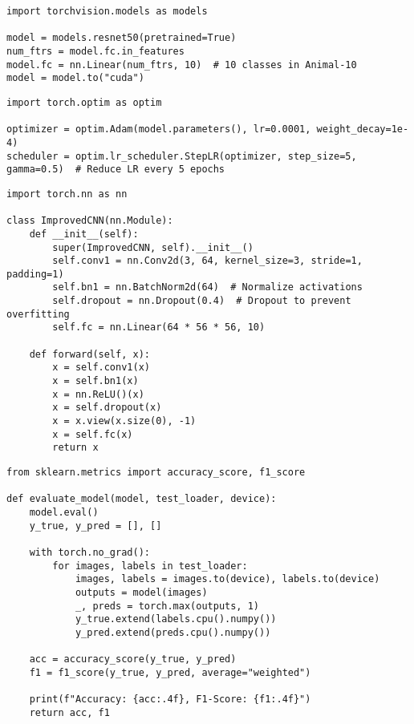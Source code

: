 \begin{verbatim}
import torchvision.models as models

model = models.resnet50(pretrained=True)
num_ftrs = model.fc.in_features
model.fc = nn.Linear(num_ftrs, 10)  # 10 classes in Animal-10
model = model.to("cuda")

\end{verbatim}

\begin{verbatim}
import torch.optim as optim

optimizer = optim.Adam(model.parameters(), lr=0.0001, weight_decay=1e-4)
scheduler = optim.lr_scheduler.StepLR(optimizer, step_size=5, gamma=0.5)  # Reduce LR every 5 epochs

\end{verbatim}

\begin{verbatim}
import torch.nn as nn

class ImprovedCNN(nn.Module):
    def __init__(self):
        super(ImprovedCNN, self).__init__()
        self.conv1 = nn.Conv2d(3, 64, kernel_size=3, stride=1, padding=1)
        self.bn1 = nn.BatchNorm2d(64)  # Normalize activations
        self.dropout = nn.Dropout(0.4)  # Dropout to prevent overfitting
        self.fc = nn.Linear(64 * 56 * 56, 10)

    def forward(self, x):
        x = self.conv1(x)
        x = self.bn1(x)
        x = nn.ReLU()(x)
        x = self.dropout(x)
        x = x.view(x.size(0), -1)
        x = self.fc(x)
        return x

\end{verbatim}

\begin{verbatim}
from sklearn.metrics import accuracy_score, f1_score

def evaluate_model(model, test_loader, device):
    model.eval()
    y_true, y_pred = [], []

    with torch.no_grad():
        for images, labels in test_loader:
            images, labels = images.to(device), labels.to(device)
            outputs = model(images)
            _, preds = torch.max(outputs, 1)
            y_true.extend(labels.cpu().numpy())
            y_pred.extend(preds.cpu().numpy())

    acc = accuracy_score(y_true, y_pred)
    f1 = f1_score(y_true, y_pred, average="weighted")

    print(f"Accuracy: {acc:.4f}, F1-Score: {f1:.4f}")
    return acc, f1

\end{verbatim}

